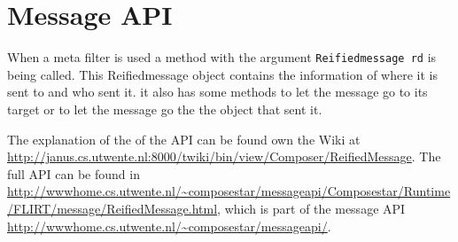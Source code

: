 
\chapter{Message API}
When a meta filter is used a method with the argument \lstinline|Reifiedmessage rd| is being called.
This Reifiedmessage object contains the information of where it is sent to and who sent it.
it also has some methods to let the message go to its target or to let the message go the the object that sent it.

The explanation of the of the API can be found own the \Compose* Wiki at \url{http://janus.cs.utwente.nl:8000/twiki/bin/view/Composer/ReifiedMessage}.
The full API can be found in \url{http://wwwhome.cs.utwente.nl/~composestar/messageapi/Composestar/Runtime/FLIRT/message/ReifiedMessage.html}, which is part of the message API \url{http://wwwhome.cs.utwente.nl/~composestar/messageapi/}.